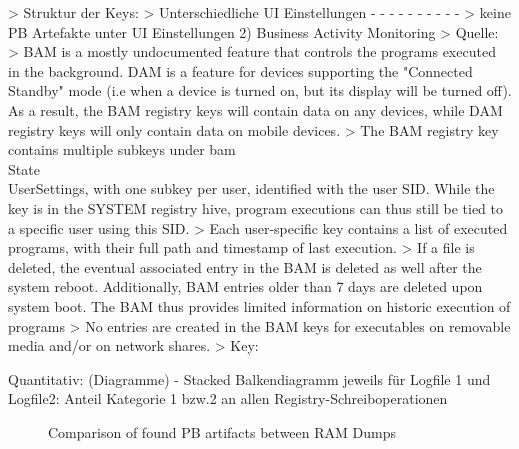 		> Struktur der Keys: %
		> Unterschiedliche UI Einstellungen
			- %
			- %
			- %
			- %
			- %
			- %
			- %
			- %
			- %
			- %
		> keine PB Artefakte unter UI Einstellungen	
	2) Business Activity Monitoring %
		> Quelle: %
		> BAM is a mostly undocumented feature that controls the programs executed in the background. DAM is a feature for devices supporting the "Connected Standby" mode (i.e when a device is turned on, but its display will be turned off). As a result, the BAM registry keys will contain data on any devices, while DAM registry keys will only contain data on mobile devices.
		> The BAM registry key contains multiple subkeys under bam\\State\\UserSettings, with one subkey per user, identified with the user SID. While the key is in the SYSTEM registry hive, program executions can thus still be tied to a specific user using this SID.
		> Each user-specific key contains a list of executed programs, with their full path and timestamp of last execution.
		> If a file is deleted, the eventual associated entry in the BAM is deleted as well after the system reboot. Additionally, BAM entries older than 7 days are deleted upon system boot. The BAM thus provides limited information on historic execution of programs
		> No entries are created in the BAM keys for executables on removable media and/or on network shares.
		> Key: %

Quantitativ: (Diagramme)
	- Stacked Balkendiagramm jeweils für Logfile 1 und Logfile2: Anteil Kategorie 1 bzw.2 an allen Registry-Schreiboperationen
	\begin{figure}[h!]
		\centerline{}
		\label{chart:final-criteria}  
		\caption{Comparison of found PB artifacts between RAM Dumps}
	\end{figure}

